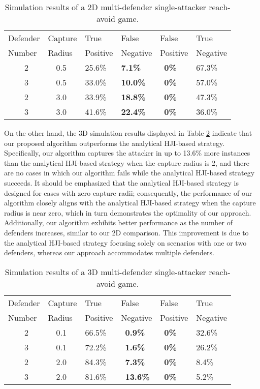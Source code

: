 \documentclass[journal]{IEEEtran}
\newcommand{\1}{\mathbf{1}}
\begin{document}
\begin{table}[!ht]
\caption{Simulation results of a 2D multi-defender single-attacker reach-avoid game.}
\label{table:1}
\centering
\begin{tabular}{llllll}
\hline
Defender & Capture & True & False & False & True \\
Number & Radius & Positive & Negative & Positive & Negative \\ \hline
    ~~~~2 & ~~0.5 & 25.6\% & \textbf{7.1\%} & ~\textbf{0\%} & 67.3\%  \\
    ~~~~3 & ~~0.5 & 33.0\% & \textbf{10.0\%} & ~\textbf{0\%} & 57.0\%  \\
    \hline
    ~~~~2 & ~~3.0 & 33.9\% & \textbf{18.8\%} & ~\textbf{0\%} & 47.3\%  \\
    ~~~~3 & ~~3.0 & 41.6\% & \textbf{22.4\%} & ~\textbf{0\%} & 36.0\%  \\
    \hline
\end{tabular}
\end{table}

On the other hand, the 3D simulation results displayed in Table \ref{table:2} indicate that our proposed algorithm outperforms the analytical HJI-based strategy. Specifically, our algorithm captures the attacker in up to 13.6\% more instances than the analytical HJI-based strategy when the capture radius is 2, and there are no cases in which our algorithm fails while the analytical HJI-based strategy succeeds. It should be emphasized that the analytical HJI-based strategy is designed for cases with zero capture radii; consequently, the performance of our algorithm closely aligns with the analytical HJI-based strategy when the capture radius is near zero, which in turn demonstrates the optimality of our approach. Additionally, our algorithm exhibits better performance as the number of defenders increases, similar to our 2D comparison. This improvement is due to the analytical HJI-based strategy focusing solely on scenarios with one or two defenders, whereas our approach accommodates multiple defenders.

\begin{table}[!ht]
\caption{Simulation results of a 3D multi-defender single-attacker reach-avoid game.}
\label{table:2}
\centering
\begin{tabular}{llllll}
\hline
Defender & Capture & True & False & False & True \\
Number & Radius & Positive & Negative & Positive & Negative \\ \hline
    ~~~~2 & ~~0.1 & 66.5\% & ~\textbf{0.9\%} & ~\textbf{0\%} & 32.6\%\\
    ~~~~3 & ~~0.1 & 72.2\% & ~\textbf{1.6\%} & ~\textbf{0\%} & 26.2\%\\
    \hline
    ~~~~2 & ~~2.0 & 84.3\% & ~\textbf{7.3\%} & ~\textbf{0\%} & 8.4\%\\
    ~~~~3 & ~~2.0 & 81.6\% & ~\textbf{13.6\%} & ~\textbf{0\%} & 5.2\%\\
    \hline
\end{tabular}
\end{table}
 
\end{document}
